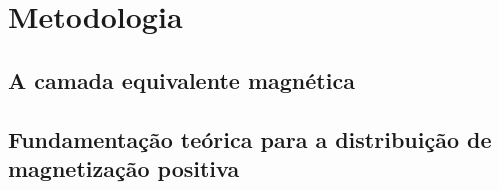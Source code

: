 \chapter{Metodologia}
\label{chap:metodologia}

\section{A camada equivalente magnética}
\label{sec:mag_eqlayer}

\section{Fundamentação teórica para a distribuição de magnetização positiva}
\label{sec:dist_positiva}

